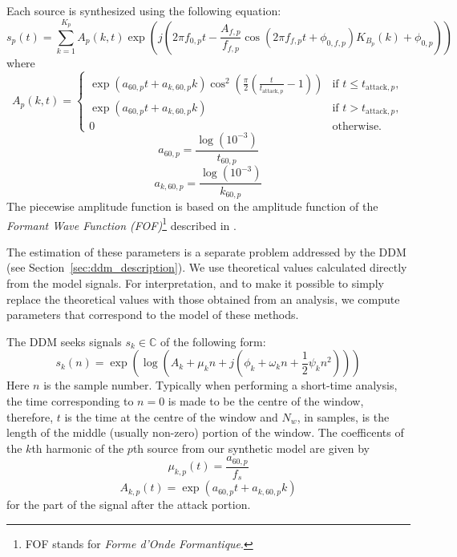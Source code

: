 Each source is synthesized using the following equation:
\begin{equation}
    s_{p}(t) = \sum_{k=1}^{K_{p}} A_{p}(k,t) \exp(j(2\pi
    f_{0,p}t - \frac{A_{f,p}}{f_{f,p}} \cos(2\pi f_{f,p} t +
    \phi_{0,f,p}) K_{B_{p}}(k) + \phi_{0,p}))
\end{equation}
where
\begin{equation}
    A_{p}(k,t) = 
    \begin{cases}
        \exp(a_{60,p} t + a_{k,60,p}k) \cos^{2}
        (\frac{\pi}{2}(\frac{t}{t_{\text{attack},p}} - 1)) & \text{if } t \leq
        t_{\text{attack},p},\\
        \exp(a_{60,p} t + a_{k,60,p}k) & \text{if } t > t_{\text{attack},p},\\
        0 & \text{otherwise}.
    \end{cases}
\end{equation}
\begin{equation}
    a_{60,p} = \frac{\log(10^{-3})}{t_{60,p}}
\end{equation}
\begin{equation}
    a_{k,60,p} = \frac{\log(10^{-3})}{k_{60,p}} 
\end{equation}
The piecewise amplitude function is based on the amplitude function of the
\textit{Formant Wave Function (FOF)}\footnote{FOF stands for \textit{Forme
d'Onde Formantique}.} described in \cite[p.~19]{rodet1984chant}.

The estimation of these parameters is a separate problem addressed by the
DDM (see Section~\ref{sec:ddm_description}). We use theoretical values calculated
directly from the model signals. For interpretation, and to make it possible to
simply replace the theoretical values with those obtained from an analysis, we
compute parameters that correspond to the model of these methods.

The DDM seeks signals $s_k \in \mathbb{C}$ of the following form:
\begin{equation}
    s_{k}(n) = \exp(\log(A_{k} + \mu_{k}n + j(\phi_{k} + \omega_{k}n +
    \frac{1}{2} \psi_{k} n^{2}))) \label{eq:rm_model}
\end{equation}
Here $n$ is the sample number. Typically when performing a short-time analysis,
the time corresponding to $n = 0$ is made to be the centre of the window,
therefore, $t$ is the time at the centre of the window and $N_{w}$, in samples,
is the length of the middle (usually non-zero) portion of the window. The
coefficents of the $k$th harmonic of the $p$th source from our synthetic model
are given by
\begin{equation}
    \mu_{k,p}(t) = \frac{a_{60,p}}{f_{s}}
\end{equation}
\begin{equation}
    A_{k,p}(t) = \exp(a_{60,p} t + a_{k,60,p} k)
\end{equation}
for the part of the signal after the attack portion.


